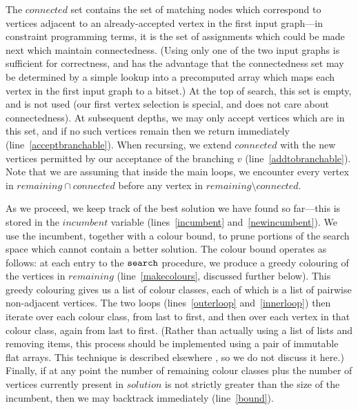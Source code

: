 \documentclass{llncs}
\newcommand{\lineref}[1]{line~\ref{#1}}
\newcommand{\twolinesref}[2]{lines~\ref{#1} and~\ref{#2}}
\begin{document}
The $\mathit{connected}$ set contains the set of matching nodes which correspond to
vertices adjacent to an already-accepted vertex in the first input graph---in constraint programming terms, it is the
set of assignments which could be made next which maintain connectedness. (Using only one of the two
input graphs is sufficient for correctness, and has the advantage that the connectedness set
may be determined by a simple lookup into a precomputed array which maps each vertex in
the first input graph to a bitset.) At the top of search, this set is empty, and is not used (our
first vertex selection is special, and does not care about connectedness). At subsequent depths, we
may only accept vertices which are in this set, and if no such vertices remain then we return
immediately (\lineref{acceptbranchable}). When recursing, we extend $\mathit{connected}$ with the
new vertices permitted by our acceptance of the branching $v$ (\lineref{addtobranchable}). Note that
we are assuming that inside the main loops, we encounter every vertex in $\mathit{remaining} \cap
\mathit{connected}$ before any vertex in $\mathit{remaining} \setminus \mathit{connected}$.

As we proceed, we keep track of the best solution we have found so far---this is stored in the
$\mathit{incumbent}$ variable (\twolinesref{incumbent}{newincumbent}). We use the incumbent,
together with a colour bound, to prune portions of the search space which cannot contain a better
solution. The colour bound operates as follows: at each entry to the $\FuncSty{search}$ procedure,
we produce a greedy colouring of the vertices in $\mathit{remaining}$ (\lineref{makecolours},
discussed further below). This greedy colouring gives us a list of colour classes, each of which is
a list of pairwise non-adjacent vertices. The two loops (\twolinesref{outerloop}{innerloop}) then
iterate over each colour class, from last to first, and then over each vertex in that colour class,
again from last to first.  (Rather than actually using a list of lists and removing items, this
process should be implemented using a pair of immutable flat arrays. This technique is described
elsewhere \cite{DBLP:conf/cp/McCreeshP14}, so we do not discuss it here.) Finally, if at any point
the number of remaining colour classes plus the number of vertices currently present in
$\mathit{solution}$ is not strictly greater than the size of the incumbent, then we may backtrack
immediately (\lineref{bound}).
\end{document}
